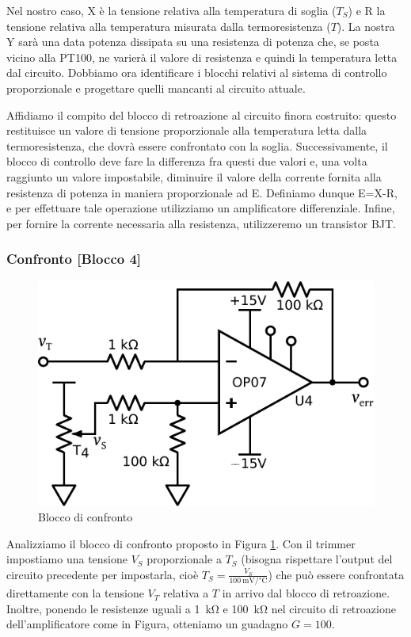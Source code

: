 Nel nostro caso, X è la tensione relativa alla temperatura di soglia ($T_{S}$) e R la tensione relativa alla temperatura misurata dalla termoresistenza ($T$).
La nostra Y sarà una data potenza dissipata su una resistenza di potenza che, se posta vicino alla PT100, ne varierà il valore di resistenza e quindi la temperatura letta dal circuito.
Dobbiamo ora identificare i blocchi relativi al sistema di controllo proporzionale e progettare quelli mancanti al circuito attuale.

Affidiamo il compito del blocco di retroazione al circuito finora costruito: questo restituisce un valore di tensione proporzionale alla temperatura letta dalla termoresistenza, che dovrà essere confrontato con la soglia.
Successivamente, il blocco di controllo deve fare la differenza fra questi due valori e, una volta raggiunto un valore impostabile, diminuire il valore della corrente fornita alla resistenza di potenza in maniera proporzionale ad E.
Definiamo dunque E=X-R, e per effettuare tale operazione utilizziamo un amplificatore differenziale.
Infine, per fornire la corrente necessaria alla resistenza, utilizzeremo un transistor BJT.
\vspace{-2mm}
\subsubsection{Confronto [Blocco 4]}

\begin{figure}
\centering
\includegraphics[width=.33\textwidth]{../E06/latex/P4.pdf}
\caption{Blocco di confronto}
\label{fig6:blocco4}
\end{figure}

Analizziamo il blocco di confronto proposto in Figura \ref{fig6:blocco4}.
Con il trimmer impostiamo una tensione $V_{S}$ proporzionale a $T_{S}$ (bisogna rispettare l'output del circuito precedente per impostarla, cioè $T_S = \frac{V_S}{\SI{100}{\milli\volt\per\celsius}}$) che può essere confrontata direttamente con la tensione $V_{T}$ relativa a $T$ in arrivo dal blocco di retroazione.
Inoltre, ponendo le resistenze uguali a \SI{1}{\kilo\ohm} e \SI{100}{\kilo\ohm} nel circuito di retroazione dell'amplificatore come in Figura, otteniamo un guadagno $G=100$.

